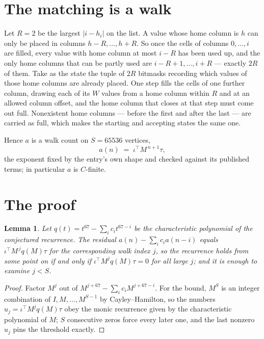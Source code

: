 \documentclass[11pt,a4paper]{article}
\theoremstyle{plain}
\newtheorem{lemma}[theorem]{Lemma}
\theoremstyle{definition}
\begin{document}
\section{The matching is a walk}

Let $R=2$ be the largest $|i-h_i|$ on the list. A value whose home column is $h$ can only be
placed in columns $h-R,\dots,h+R$. So once the cells of columns $0,\dots,i$ are filled, every
value with home column at most $i-R$ has been used up, and the only home columns that can be
partly used are $i-R+1,\dots,i+R$ --- exactly $2R$ of them. Take as the state the tuple of
$2R$ bitmasks recording which values of those home columns are already placed. One step fills
the cells of one further column, drawing each of its $W$ values from a home column within $R$
and at an allowed column offset, and the home column that closes at that step must come out
full. Nonexistent home columns --- before the first and after the last --- are carried as
full, which makes the starting and accepting states the same one.

Hence $a$ is a walk count on $S=65536$ vertices,
\[
a(n)\;=\;\iota^{\!\top}M^{\,n+1}\tau ,
\]
the exponent fixed by the entry's own shape and checked against its published terms; in
particular $a$ is $C$-finite.

\section{The proof}

\begin{lemma}\label{lem:crit}
Let $q(t)=t^{67}-\sum_i c_it^{67-i}$ be the characteristic polynomial of the
conjectured recurrence. The residual $a(n)-\sum_ic_ia(n-i)$ equals
$\iota^{\!\top}M^{\,j}q(M)\tau$ for the corresponding walk index $j$, so the recurrence
holds from some point on if and only if $\iota^{\!\top}M^{j}q(M)\tau=0$ for all large $j$;
and it is enough to examine $j<S$.
\end{lemma}

\begin{proof}
Factor $M^{j}$ out of $M^{j+67}-\sum_ic_iM^{j+67-i}$. For the bound, $M^{S}$
is an integer combination of $I,M,\dots,M^{S-1}$ by Cayley--Hamilton, so the numbers
$u_j=\iota^{\!\top}M^{j}q(M)\tau$ obey the monic recurrence given by the characteristic
polynomial of $M$; $S$ consecutive zeros force every later one, and the last nonzero $u_j$
pins the threshold exactly.
\end{proof}
\end{document}

